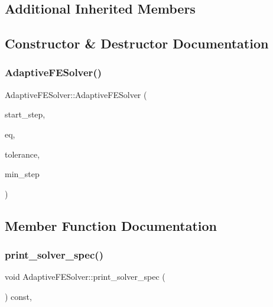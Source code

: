 \subsection*{Additional Inherited Members}


\subsection{Constructor \& Destructor Documentation}
\mbox{\label{classAdaptiveFESolver_aeeb5a4b36f9e54027ddc576fa0c73b83}} 
\subsubsection{\texorpdfstring{Adaptive\+F\+E\+Solver()}{AdaptiveFESolver()}}
{\footnotesize\ttfamily Adaptive\+F\+E\+Solver\+::\+Adaptive\+F\+E\+Solver (\begin{DoxyParamCaption}\item[{double}]{start\+\_\+step,  }\item[{const \hyperlink{classBaseEquation}{Base\+Equation} \&}]{eq,  }\item[{double}]{tolerance,  }\item[{double}]{min\+\_\+step }\end{DoxyParamCaption})\hspace{0.3cm}{\ttfamily [inline]}}



\subsection{Member Function Documentation}
\mbox{\label{classAdaptiveFESolver_a8d15ec3bd7db8e46eca25382ba8130ae}} 
\subsubsection{\texorpdfstring{print\+\_\+solver\+\_\+spec()}{print\_solver\_spec()}}
{\footnotesize\ttfamily void Adaptive\+F\+E\+Solver\+::print\+\_\+solver\+\_\+spec (\begin{DoxyParamCaption}{ }\end{DoxyParamCaption}) const\hspace{0.3cm}{\ttfamily [override]}, {\ttfamily [virtual]}}



